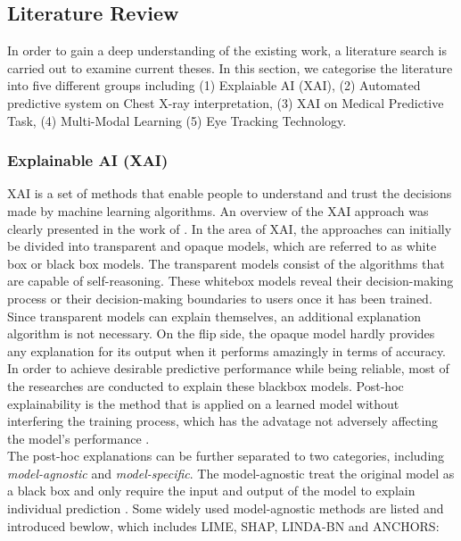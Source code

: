 
\subsection{Literature Review}

In order to gain a deep understanding of the existing work, a literature search is carried out to examine current theses. In this section, we categorise the literature into five different groups including (1) Explaiable AI (XAI), (2) Automated predictive system on Chest X-ray interpretation, (3) XAI on Medical Predictive Task, (4) Multi-Modal Learning (5) Eye Tracking Technology.

\subsubsection{Explainable AI (XAI)}

XAI is a set of methods that enable people to understand and trust the decisions made by machine learning algorithms. An overview of the XAI approach was clearly presented in the work of \citet{Belle2020XAIPriciples}. In the area of ​XAI, the approaches can initially be divided into transparent and opaque models, which are referred to as white box or black box models. The transparent models consist of the algorithms that are capable of self-reasoning. These whitebox models reveal their decision-making process or their decision-making boundaries to users once it has been trained. Since transparent models can explain themselves, an additional explanation algorithm is not necessary. On the flip side, the opaque model hardly provides any explanation for its output when it performs amazingly in terms of accuracy. In order to achieve desirable predictive performance while being reliable, most of the researches are conducted to explain these blackbox models. Post-hoc explainability is the method that is applied on a learned model without interfering the training process, which has the advatage not adversely affecting the model's performance \citep{Karlo2018XAISurvey} \citep{Belle2020XAIPriciples}. \\

The post-hoc explanations can be further separated to two categories, including \textit{model-agnostic} and \textit{model-specific}. The model-agnostic treat the original model as a black box and only require the input and output of the model to explain individual prediction \citep{Ribeiro2016Modelagnostic} \citep{Karlo2018XAISurvey} \citep{Ribeiro2018Anchors}. Some widely used model-agnostic methods are listed and introduced bewlow, which includes LIME\citep{Ribeiro2016LIME}, SHAP\citep{Lundberg2017SHAP}, LINDA-BN\citep{Moreira2021LINDA} and ANCHORS\citep{Ribeiro2018Anchors}:

